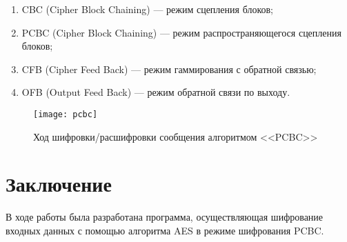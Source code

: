 \documentclass[14pt, oneside, a4paper]{extreport}
\begin{document}
\begin{enumerate}
	\item CBC (Cipher Block Chaining) --- режим сцепления блоков;
	\item PCBC (Cipher Block Chaining) --- режим распространяющегося сцепления блоков;
	\item CFB (Cipher Feed Back) --- режим гаммирования с обратной связью;
	\item OFB (Output Feed Back) --- режим обратной связи по выходу.
\end{enumerate}

\begin{figure}[!ht]
   \texttt{[image: pcbc]}
   \caption{Ход шифровки/расшифровки сообщения алгоритмом <<PCBC>>}
   \label{fig:pcbc}
\end{figure}

\section*{Заключение}

В ходе работы была разработана программа, осуществляющая шифрование входных данных с помощью алгоритма AES в режиме шифрования PCBC.


%
%
\end{document}
